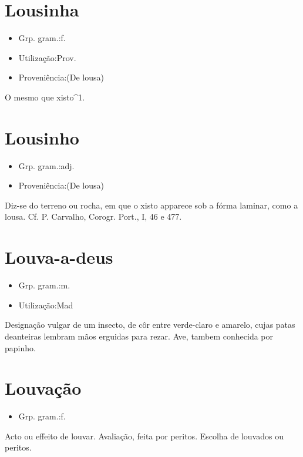 \section{Lousinha}
\begin{itemize}
\item {Grp. gram.:f.}
\end{itemize}
\begin{itemize}
\item {Utilização:Prov.}
\end{itemize}
\begin{itemize}
\item {Proveniência:(De \textunderscore lousa\textunderscore )}
\end{itemize}
O mesmo que \textunderscore xisto\textunderscore ^1.
\section{Lousinho}
\begin{itemize}
\item {Grp. gram.:adj.}
\end{itemize}
\begin{itemize}
\item {Proveniência:(De \textunderscore lousa\textunderscore )}
\end{itemize}
Diz-se do terreno ou rocha, em que o xisto apparece sob a fórma laminar, como a lousa. Cf. P. Carvalho, \textunderscore Corogr. Port.\textunderscore , I, 46 e 477.
\section{Louva-a-deus}
\begin{itemize}
\item {Grp. gram.:m.}
\end{itemize}
\begin{itemize}
\item {Utilização:Mad}
\end{itemize}
Designação vulgar de um insecto, de côr entre verde-claro e amarelo, cujas patas deanteiras lembram mãos erguidas para rezar.
Ave, tambem conhecida por \textunderscore papinho\textunderscore .
\section{Louvação}
\begin{itemize}
\item {Grp. gram.:f.}
\end{itemize}
Acto ou effeito de louvar.
Avaliação, feita por peritos.
Escolha de louvados ou peritos.
